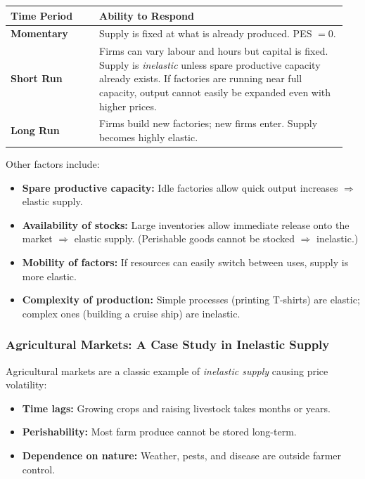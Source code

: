 \documentclass[11pt, a4paper, twoside]{book}
\begin{document}
\begin{tcolorbox}[enhanced,colback=LightBlue,colframe=MidBlue!70,arc=0pt,boxrule=0.8pt]
\begin{tabular}{@{}>{\RaggedRight\arraybackslash}p{0.25\linewidth}>{\RaggedRight\arraybackslash}p{0.7\linewidth}@{}}
\textbf{\color{NavyPrimary}Time Period} & \textbf{\color{NavyPrimary}Ability to Respond} \\
\midrule
\textbf{Momentary} & Supply is fixed at what is already produced. PES $= 0$. \\
\textbf{Short Run} & Firms can vary labour and hours but capital is fixed. Supply is \emph{inelastic} unless spare productive capacity already exists. If factories are running near full capacity, output cannot easily be expanded even with higher prices. \\
\textbf{Long Run} & Firms build new factories; new firms enter. Supply becomes highly elastic. \\
\end{tabular}
\end{tcolorbox}

Other factors include:
\begin{itemize}
  \item \textbf{Spare productive capacity:} Idle factories allow quick output increases $\Rightarrow$ elastic supply.
  \item \textbf{Availability of stocks:} Large inventories allow immediate release onto the market $\Rightarrow$ elastic supply. (Perishable goods cannot be stocked $\Rightarrow$ inelastic.)
  \item \textbf{Mobility of factors:} If resources can easily switch between uses, supply is more elastic.
  \item \textbf{Complexity of production:} Simple processes (printing T-shirts) are elastic; complex ones (building a cruise ship) are inelastic.
\end{itemize}

\subsubsection{Agricultural Markets: A Case Study in Inelastic Supply}

Agricultural markets are a classic example of \emph{inelastic supply} causing price volatility:
\begin{itemize}
  \item \textbf{Time lags:} Growing crops and raising livestock takes months or years.
  \item \textbf{Perishability:} Most farm produce cannot be stored long-term.
  \item \textbf{Dependence on nature:} Weather, pests, and disease are outside farmer control.
\end{itemize}
\end{document}
